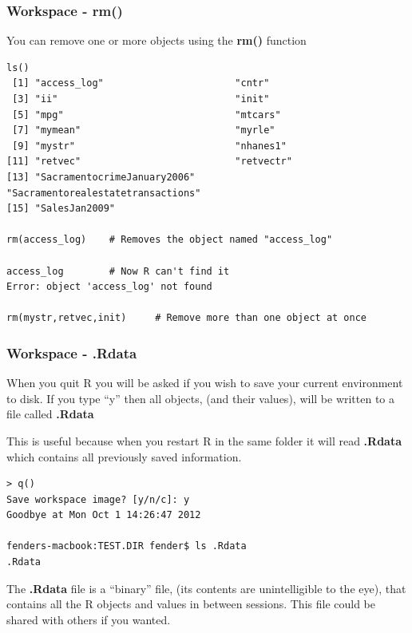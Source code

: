 \documentclass{beamer}
\begin{document}
\begin{frame}[fragile]
\frametitle{Workspace - rm()}
You can remove one or more objects using the \textbf{rm()} function
\footnotesize
\begin{verbatim}
ls()
 [1] "access_log"                       "cntr"                            
 [3] "ii"                               "init"                            
 [5] "mpg"                              "mtcars"                          
 [7] "mymean"                           "myrle"                           
 [9] "mystr"                            "nhanes1"                         
[11] "retvec"                           "retvectr"                        
[13] "SacramentocrimeJanuary2006"       "Sacramentorealestatetransactions"
[15] "SalesJan2009"                    

rm(access_log)    # Removes the object named "access_log"

access_log        # Now R can't find it
Error: object 'access_log' not found

rm(mystr,retvec,init)     # Remove more than one object at once
\end{verbatim}
\end{frame}


\begin{frame}[fragile]
\frametitle{Workspace - .Rdata}
When you quit R you will be asked if you wish to save your current environment to disk. If you type ``y'' then all objects, (and their values), will be written to a file called \textbf{.Rdata}

This is useful because when you restart R in the same folder it will read \textbf{.Rdata} which contains all previously saved information.
\footnotesize
\begin{verbatim}
> q()
Save workspace image? [y/n/c]: y
Goodbye at Mon Oct 1 14:26:47 2012

fenders-macbook:TEST.DIR fender$ ls .Rdata
.Rdata
\end{verbatim}
\normalsize
The \textbf{.Rdata} file is a ``binary'' file, (its contents are unintelligible to the eye), that contains all the R objects and values in between sessions. This file could be shared with others if you wanted. 
\end{frame}


\end{document}
